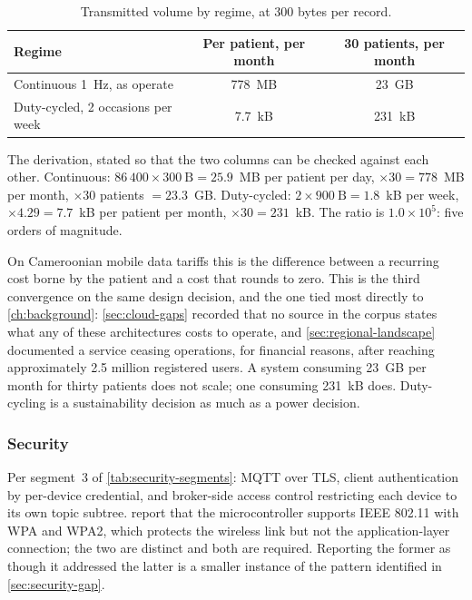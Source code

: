 \documentclass[12pt,a4paper,oneside]{report}
\begin{document}
\begin{table}[htbp]
\centering\small
\caption{Transmitted volume by regime, at 300 bytes per record.}\label{tab:data-volume}
\begin{tabularx}{\textwidth}{@{}X c c@{}}
\toprule
\textbf{Regime} & \textbf{Per patient, per month} & \textbf{30 patients, per month} \\
\midrule
Continuous 1~Hz, as \textcite{efendi2025} operate & 778~MB & 23~GB \\
Duty-cycled, 2 occasions per week & 7.7~kB & 231~kB \\
\bottomrule
\end{tabularx}
\end{table}

The derivation, stated so that the two columns can be checked against each other. Continuous: $86\,400 \times 300~\text{B} = 25.9$~MB per patient per day, $\times 30 = 778$~MB per month, $\times 30$ patients $= 23.3$~GB. Duty-cycled: $2 \times 900~\text{B} = 1.8$~kB per week, $\times 4.29 = 7.7$~kB per patient per month, $\times 30 = 231$~kB. The ratio is $1.0 \times 10^5$: five orders of magnitude.

On Cameroonian mobile data tariffs this is the difference between a recurring cost borne by the patient and a cost that rounds to zero. This is the third convergence on the same design decision, and the one tied most directly to \cref{ch:background}: \cref{sec:cloud-gaps} recorded that no source in the corpus states what any of these architectures costs to operate, and \cref{sec:regional-landscape} documented a service ceasing operations, for financial reasons, after reaching approximately 2.5 million registered users. A system consuming 23~GB per month for thirty patients does not scale; one consuming 231~kB does. Duty-cycling is a sustainability decision as much as a power decision.

\subsubsection{Security}

Per segment~3 of \cref{tab:security-segments}: MQTT over TLS, client authentication by per-device credential, and broker-side access control restricting each device to its own topic subtree. \Textcite{efendi2025} report that the microcontroller supports IEEE 802.11 with WPA and WPA2, which protects the wireless link but not the application-layer connection; the two are distinct and both are required. Reporting the former as though it addressed the latter is a smaller instance of the pattern identified in \cref{sec:security-gap}.
\end{document}
